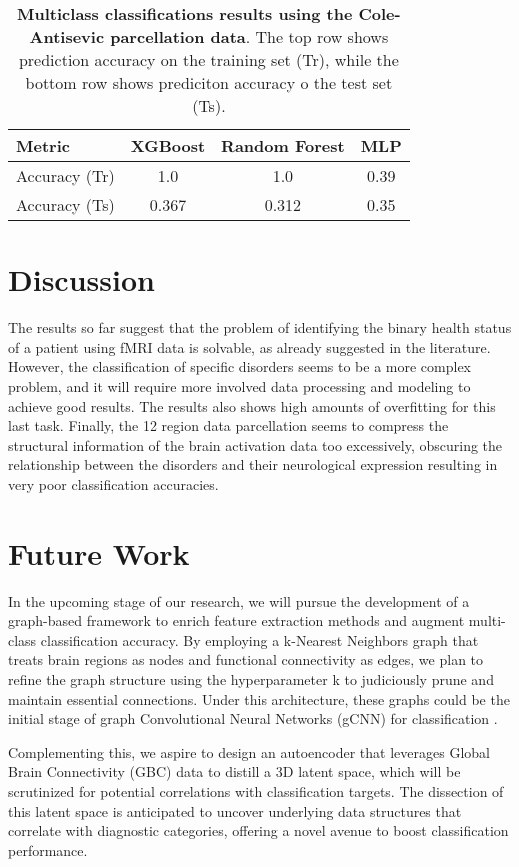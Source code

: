 \documentclass[fleqn,moreauthors,10pt]{ds_report}
\begin{document}
\begin{table}[h!]
\centering
\begin{tabular}{|l|c|c|c|}
\hline
\textbf{Metric} & \textbf{XGBoost} & \textbf{Random Forest} & \textbf{MLP} \\ \hline
Accuracy (Tr) & 1.0 & 1.0 & 0.39 \\ \hline
Accuracy (Ts) & 0.367 & 0.312 & 0.35 \\ \hline
\end{tabular}
\caption{\textbf{Multiclass classifications results using the Cole-Antisevic parcellation data}. The top row shows prediction accuracy on the training set (Tr), while the bottom row shows prediciton accuracy o the test set (Ts).}
\label{tab:cole_multiclass_classification}
\end{table}

\section*{Discussion}
The results so far suggest that the problem of identifying the binary health status of a patient using fMRI data is solvable, as already suggested in the literature. However, the classification of specific disorders seems to be a more complex problem, and it will require more involved data processing and modeling to achieve good results. The results also shows high amounts of overfitting for this last task.  Finally, the 12 region data parcellation seems to compress the structural information of the brain activation data too excessively, obscuring the relationship between the disorders and their neurological expression resulting in very poor classification accuracies.

\section*{Future Work}
In the upcoming stage of our research, we will pursue the development of a graph-based framework to enrich feature extraction methods and augment multi-class classification accuracy. By employing a k-Nearest Neighbors graph that treats brain regions as nodes and functional connectivity as edges, we plan to refine the graph structure using the hyperparameter k to judiciously prune and maintain essential connections. Under this architecture, these graphs could be the initial stage of graph Convolutional Neural Networks (gCNN) for classification \cite{Wang2021-ts}.

Complementing this, we aspire to design an autoencoder that leverages Global Brain Connectivity (GBC) data to distill a 3D latent space, which will be scrutinized for potential correlations with classification targets. The dissection of this latent space is anticipated to uncover underlying data structures that correlate with diagnostic categories, offering a novel avenue to boost classification performance.





\end{document}

